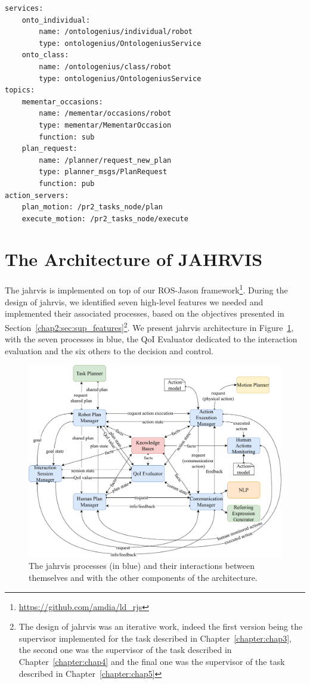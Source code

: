 \documentclass[a4paper,11pt,twoside]{StyleThese}
\begin{document}
\begin{lstlisting}[caption={Example of service, topic and action server definitions in a YAML file.}, label={chap2:lst:ros-jason}]
services:
	onto_individual: 
		name: /ontologenius/individual/robot
		type: ontologenius/OntologeniusService
	onto_class: 
		name: /ontologenius/class/robot
		type: ontologenius/OntologeniusService
topics:
	mementar_occasions: 
		name: /mementar/occasions/robot
		type: mementar/MementarOccasion
		function: sub
	plan_request:
		name: /planner/request_new_plan
		type: planner_msgs/PlanRequest
		function: pub
action_servers:
	plan_motion: /pr2_tasks_node/plan
	execute_motion: /pr2_tasks_node/execute
\end{lstlisting}


\section{The Architecture of JAHRVIS}\label{chap2:sec:jahrvis}
The \acrfull{jahrvis} is implemented on top of our ROS-Jason framework\footnote{\url{https://github.com/amdia/ld_rjs}}. During the design of \acrshort{jahrvis}, we identified seven high-level features we needed and implemented their associated processes, based on the objectives presented in Section~\ref{chap2:sec:sup_features}\footnote{The design of \acrshort{jahrvis} was an iterative work, indeed the first version being the supervisor implemented for the task described in Chapter~\ref{chapter:chap3}, the second one was the supervisor of the task described in Chapter~\ref{chapter:chap4} and the final one was the supervisor of the task described in Chapter~\ref{chapter:chap5}}. We present \acrshort{jahrvis} architecture in Figure~\ref{chap2:fig:sup_overview}, with the seven processes in blue, the QoI Evaluator dedicated to the interaction evaluation and the six others to the decision and control. 

\begin{figure}[!ht]
	\includegraphics[width=\linewidth]{figures/chapter2/supervisor_modules.pdf}
	\caption{The \acrshort{jahrvis} processes (in blue) and their interactions between themselves and with the other components of the architecture.}
	\label{chap2:fig:sup_overview}
\end{figure}
\end{document}
